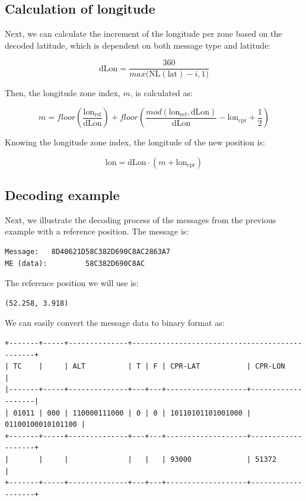 \subsection{Calculation of longitude}

Next, we can calculate the increment of the longitude per zone based on the decoded latitude, which is dependent on both message type and latitude:

\begin{equation}
  \mathrm{dLon} = \frac{360}{max\Big( \mathrm{NL}(\mathrm{lat})-i, 1 \Big)}
\end{equation}


Then, the longitude zone index, $m$, is calculated as:

\begin{equation}
  m = floor \left( \frac{\mathrm{lon}_\mathrm{ref}}{\mathrm{dLon}} \right) + floor \left( \frac{mod(\mathrm{lon}_\mathrm{ref}, \mathrm{dLon})}{\mathrm{dLon}}  - \mathrm{lon}_\mathrm{cpr}  + \frac{1}{2}  \right)
\end{equation}

Knowing the longitude zone index, the longitude of the new position is:

\begin{equation}
  \mathrm{lon} = \mathrm{dLon} \cdot (m + \mathrm{lon}_\mathrm{cpr})
\end{equation}


\subsection{Decoding example}

Next, we illustrate the decoding process of the messages from the previous example with a reference position. The message is:

\begin{verbatim}
Message:   8D40621D58C382D690C8AC2863A7
ME (data):         58C382D690C8AC
\end{verbatim}

The reference position we will use is:

\begin{verbatim}
(52.258, 3.918)
\end{verbatim}

We can easily convert the message data to binary format as:

\begin{verbatim}
+-------+-----+--------------+-----------------------------------------------+
| TC    |     | ALT          | T | F | CPR-LAT           | CPR-LON           |
|-------+-----+--------------+---+---+-------------------+-------------------|
| 01011 | 000 | 110000111000 | 0 | 0 | 10110101101001000 | 01100100010101100 |
+-------+-----+--------------+---+---+-------------------+-------------------+
|       |     |              |   |   | 93000             | 51372             |
+-------+-----+--------------+---+---+-------------------+-------------------+
\end{verbatim}


